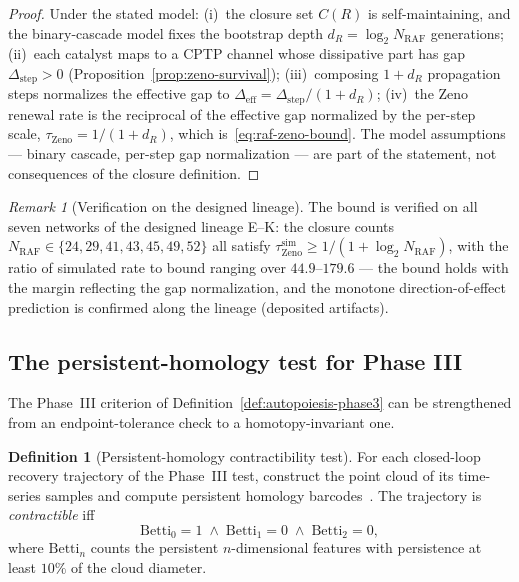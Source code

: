 \documentclass[11pt,a4paper]{article}
\theoremstyle{plain}
\theoremstyle{definition}
\newtheorem{definition}[theorem]{Definition}
\theoremstyle{remark}
\newtheorem{remark}[theorem]{Remark}
\begin{document}
\begin{proof}
Under the stated model: (i)~the closure set $C(R)$ is
self-maintaining, and the binary-cascade model fixes the bootstrap
depth $d_R=\log_2N_{\mathrm{RAF}}$ generations; (ii)~each catalyst
maps to a CPTP channel whose dissipative part has gap
$\Delta_{\mathrm{step}}>0$
(Proposition~\ref{prop:zeno-survival}); (iii)~composing
$1+d_R$ propagation steps normalizes the effective gap to
$\Delta_{\mathrm{eff}}=\Delta_{\mathrm{step}}/(1+d_R)$; (iv)~the
Zeno renewal rate is the reciprocal of the effective gap
normalized by the per-step scale, $\tau_{\mathrm{Zeno}}=
1/(1+d_R)$, which is~\eqref{eq:raf-zeno-bound}. The model
assumptions --- binary cascade, per-step gap normalization --- are
part of the statement, not consequences of the closure
definition.
\end{proof}

\begin{remark}[Verification on the designed lineage]
\label{rem:raf-zeno-verification}
The bound is verified on all seven networks of the designed
lineage E--K: the closure counts
$N_{\mathrm{RAF}}\in\{24,29,41,43,45,49,52\}$ all satisfy
$\tau_{\mathrm{Zeno}}^{\mathrm{sim}}\geq1/(1+\log_2
N_{\mathrm{RAF}})$, with the ratio of simulated rate to bound
ranging over $44.9$--$179.6$ --- the bound holds with the margin
reflecting the gap normalization, and the monotone
direction-of-effect prediction is confirmed along the lineage
(deposited artifacts).
\end{remark}

\subsection{The persistent-homology test for Phase III}
\label{sec:network-persistent}

The Phase~III criterion of Definition~\ref{def:autopoiesis-phase3}
can be strengthened from an endpoint-tolerance check to a
homotopy-invariant one.

\begin{definition}[Persistent-homology contractibility test]
\label{def:persistent-homology-contractibility}
For each closed-loop recovery trajectory of the Phase~III test,
construct the point cloud of its time-series samples and compute
persistent homology barcodes~\citep{tralie2018ripser}. The
trajectory is \emph{contractible} iff
\begin{equation}
  \mathrm{Betti}_0 = 1 \;\wedge\; \mathrm{Betti}_1 = 0 \;\wedge\;
  \mathrm{Betti}_2 = 0,
\end{equation}
where $\mathrm{Betti}_n$ counts the persistent
$n$-dimensional features with persistence at least $10\%$ of the
cloud diameter.
\end{definition}
\end{document}
